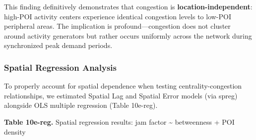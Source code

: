 \documentclass[12pt,a4paper]{article}
\begin{document}
This finding definitively demonstrates that congestion is \textbf{location-independent}: high-POI activity centers experience identical congestion levels to low-POI peripheral areas. The implication is profound---congestion does not cluster around activity generators but rather occurs uniformly across the network during synchronized peak demand periods.

\subsubsection{Spatial Regression Analysis}

To properly account for spatial dependence when testing centrality-congestion relationships, we estimated Spatial Lag and Spatial Error models (via spreg) alongside OLS multiple regression (Table 10e-reg).

\textbf{Table 10e-reg.} Spatial regression results: jam factor \textasciitilde{} betweenness + POI density
\end{document}
